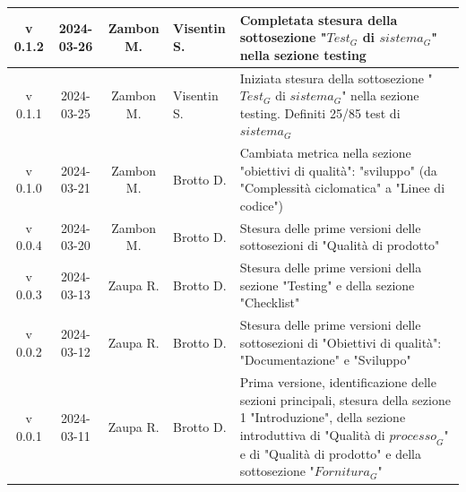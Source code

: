 \documentclass[12pt, oneside]{article}
\begin{document}
\begin{longtable}{|c|c|c|p{3cm}|p{6cm}|}
\hline
v 0.1.2 & 2024-03-26 & Zambon M. & Visentin S. & Completata stesura della sottosezione "$\textit{Test}_G$ di $\textit{sistema}_G$" nella sezione testing\\
\hline
v 0.1.1 & 2024-03-25 & Zambon M. & Visentin S. & Iniziata stesura della sottosezione "$\textit{Test}_G$ di $\textit{sistema}_G$" nella sezione testing. Definiti 25/85 test di $\textit{sistema}_G$\\
\hline
v 0.1.0 & 2024-03-21 & Zambon M. & Brotto D. & Cambiata metrica nella sezione "obiettivi di qualità": "sviluppo" (da "Complessità ciclomatica" a "Linee di codice")\\
\hline
v 0.0.4 & 2024-03-20 & Zambon M. & Brotto D. & Stesura delle prime versioni delle sottosezioni di "Qualità di prodotto"\\
\hline
v 0.0.3 & 2024-03-13 & Zaupa R. & Brotto D. & Stesura delle prime versioni della sezione "Testing" e della sezione "Checklist"\\
\hline
v 0.0.2 & 2024-03-12 & Zaupa R. & Brotto D. & Stesura delle prime versioni delle sottosezioni di "Obiettivi di qualità": "Documentazione" e "Sviluppo"\\
\hline
v 0.0.1 & 2024-03-11 & Zaupa R. & Brotto D. & Prima versione, identificazione delle sezioni principali, stesura della sezione 1 "Introduzione", della sezione introduttiva di "Qualità di $\textit{processo}_G$" e di "Qualità di prodotto" e della sottosezione "$\textit{Fornitura}_G$" \\
\hline
\end{longtable}
\newpage


\tableofcontents
\newpage

\newpage

\newpage

\newpage

\newpage

\end{document}
